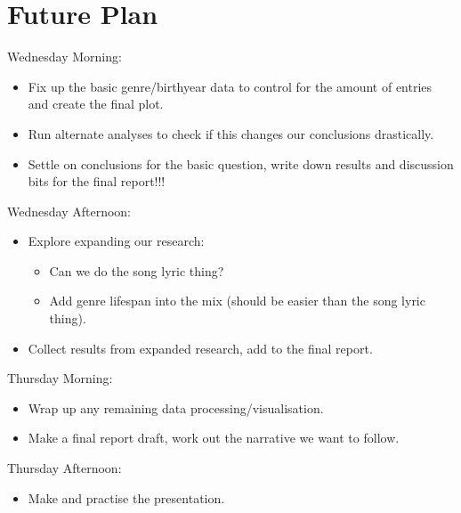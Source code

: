 \documentclass{article}
\begin{document}
\section{Future Plan}
Wednesday Morning:
\begin{itemize}
    \item Fix up the basic genre/birthyear data to control for the amount of entries and create the final plot.
    \item Run alternate analyses to check if this changes our conclusions drastically. 
    \item Settle on conclusions for the basic question, write down results and discussion bits for the final report!!!
\end{itemize}
Wednesday Afternoon:
\begin{itemize}
    \item Explore expanding our research: 
    \begin{itemize}
        \item Can we do the song lyric thing?
        \item Add genre lifespan into the mix (should be easier than the song lyric thing).
    \end{itemize}    
    \item Collect results from expanded research, add to the final report.
\end{itemize}
Thursday Morning:
\begin{itemize}
    \item Wrap up any remaining data processing/visualisation.
    \item Make a final report draft, work out the narrative we want to follow. 
\end{itemize}    
Thursday Afternoon:
\begin{itemize}
    \item Make and practise the presentation.
\end{itemize}    
    
\printbibliography
\end{document}
